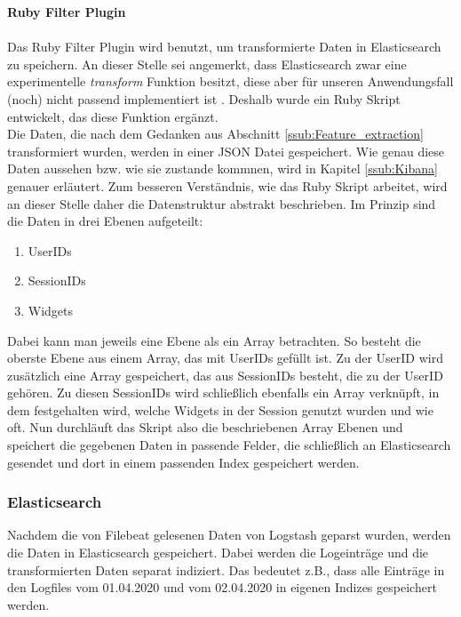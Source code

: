 \textbf{Ruby Filter Plugin}\\
\\
Das Ruby Filter Plugin wird benutzt, um transformierte Daten in Elasticsearch zu speichern. An dieser Stelle sei angemerkt, dass Elasticsearch zwar eine experimentelle \textit{transform} Funktion besitzt, diese aber für unseren Anwendungsfall (noch) nicht passend implementiert ist \citep{ElTr20}. Deshalb wurde ein Ruby Skript entwickelt, das diese Funktion ergänzt.\\

Die Daten, die nach dem Gedanken aus Abschnitt \ref{ssub:Feature_extraction} transformiert wurden, werden in einer JSON Datei gespeichert. Wie genau diese Daten aussehen bzw. wie sie zustande kommnen, wird in Kapitel \ref{ssub:Kibana} genauer erläutert. Zum besseren Verständnis, wie das Ruby Skript arbeitet, wird an dieser Stelle daher die Datenstruktur abstrakt beschrieben.
Im Prinzip sind die Daten in drei Ebenen aufgeteilt:\\
\begin{enumerate}
	\item UserIDs
	\item SessionIDs
	\item Widgets
\end{enumerate}
Dabei kann man jeweils eine Ebene als ein Array betrachten. So besteht die oberste Ebene aus einem Array, das mit UserIDs gefüllt ist. Zu der UserID wird zusätzlich eine Array gespeichert, das aus SessionIDs besteht, die zu der UserID gehören. Zu diesen SessionIDs wird schließlich ebenfalls ein Array verknüpft, in dem festgehalten wird, welche Widgets in der Session genutzt wurden und wie oft. Nun durchläuft das Skript also die beschriebenen Array Ebenen und speichert die gegebenen Daten in passende Felder, die schließlich an Elasticsearch gesendet und dort in einem passenden Index gespeichert werden.

\subsubsection{Elasticsearch}
\label{ssub:Elasticsearch}
Nachdem die von Filebeat gelesenen Daten von Logstash geparst wurden, werden die Daten in Elasticsearch gespeichert. Dabei werden die Logeinträge und die transformierten Daten separat indiziert. Das bedeutet z.B., dass alle Einträge in den Logfiles vom 01.04.2020 und vom 02.04.2020 in eigenen Indizes gespeichert werden.

